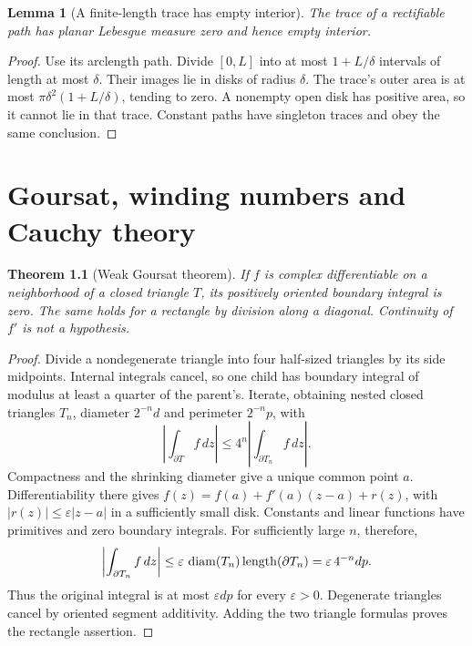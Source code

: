 \documentclass[11pt,a4paper,openany]{book}
\newtheorem{theorem}{Theorem}[chapter]
\newtheorem{lemma}[theorem]{Lemma}
\theoremstyle{definition}
\theoremstyle{remark}\newtheorem{remark}[theorem]{Remark}
\newcommand{\eps}{\varepsilon}\newcommand{\ee}{\varepsilon}
\newcommand{\dd}{\,d}\newcommand{\iu}{\mathrm i}
\newcommand{\family}[1]{}
\begin{document}
\begin{lemma}[A finite-length trace has empty interior]\label{d12:03:trace-empty-interior}
The trace of a rectifiable path has planar Lebesgue measure zero and hence
empty interior.
\end{lemma}
\begin{proof}
Use its arclength path. Divide \([0,L]\) into at most \(1+L/\delta\)
intervals of length at most \(\delta\). Their images lie in disks of
radius \(\delta\). The trace's outer area is at most
\(\pi\delta^2(1+L/\delta)\), tending to zero.
A nonempty open disk has positive area, so it cannot lie in that trace.
Constant paths have singleton traces and obey the same conclusion.
\end{proof}



\chapter{Goursat, winding numbers and Cauchy theory}\label{ch:d12-04}

\begin{theorem}[Weak Goursat theorem]\family{D12.04.01}\label{d12:04-01}
If \(f\) is complex differentiable on a neighborhood of a closed triangle
\(T\), its positively oriented boundary integral is zero. The same holds
for a rectangle by division along a diagonal. Continuity of \(f'\) is
not a hypothesis.
\end{theorem}
\begin{proof}
Divide a nondegenerate triangle into four half-sized triangles by its
side midpoints. Internal integrals cancel, so one child has boundary
integral of modulus at least a quarter of the parent's. Iterate,
obtaining nested closed triangles \(T_n\), diameter \(2^{-n}d\) and
perimeter \(2^{-n}p\), with
\[
 \left|\int_{\partial T}f\dd z\right|
 \le4^n\left|\int_{\partial T_n}f\dd z\right|.
\]
Compactness and the shrinking diameter give a unique common point \(a\).
Differentiability there gives
\(f(z)=f(a)+f'(a)(z-a)+r(z)\), with
\(|r(z)|\le\eps|z-a|\) in a sufficiently small disk.
Constants and linear functions have primitives and zero boundary integrals.
For sufficiently large \(n\), therefore,
\[
 \left|\int_{\partial T_n}f\dd z\right|
 \le\eps\,\diam(T_n)\operatorname{length}(\partial T_n)
 =\eps\,4^{-n}dp .
\]
Thus the original integral is at most \(\eps dp\) for every \(\eps>0\).
Degenerate triangles cancel by oriented segment additivity. Adding the
two triangle formulas proves the rectangle assertion.
\end{proof}
\end{document}
